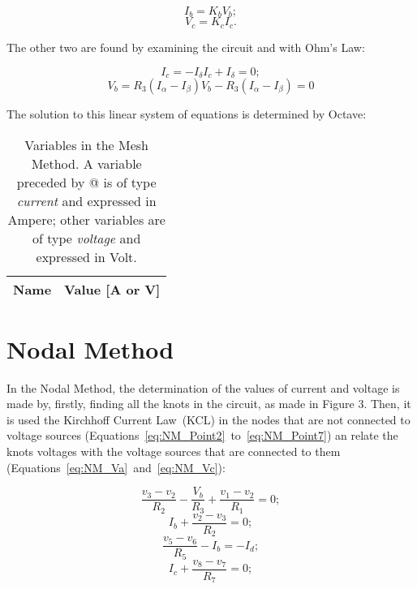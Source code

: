 \begin{equation}
  I_b = K_bV_b;
  \label{eq:Vb_Ib}
\end{equation}
\begin{equation}
  V_c = K_cI_c.
  \label{eq:Vc_Ic}
\end{equation}

The other two are found by examining the circuit and with Ohm's Law:

\begin{equation}
  I_c = -I_{\delta}
  I_c + I_{\delta} = 0;
  \label{eq:NM_Ic}
\end{equation}
\begin{equation}
  V_b = R_3(I_{\alpha}-I_{\beta})
  V_b - R_3(I_{\alpha}-I_{\beta}) = 0
  \label{eq:NM_Vb}
\end{equation}

The solution to this linear system of equations is determined by Octave:

\begin{table}[h]
  \centering
  \begin{tabular}{|l|r|}
    \hline    
    {\bf Name} & {\bf Value [A or V]} \\ \hline
    
  \end{tabular}
  \caption{Variables in the Mesh Method. A variable preceded by @ is of type {\em current} and expressed in Ampere; other variables are of type {\em voltage} and expressed in Volt.}
  \label{tab:malhas}
\end{table}

\section{Nodal Method}

In the Nodal Method, the determination of the values of current and voltage is made by, firstly, finding all the knots in the circuit, as made in Figure 3.
Then, it is used the Kirchhoff Current Law~(KCL) in the nodes that are not connected to voltage sources (Equations~\ref{eq:NM_Point2}~to~\ref{eq:NM_Point7}) an relate the knots voltages with the voltage sources that are connected to them (Equations~\ref{eq:NM_Va}~and~\ref{eq:NM_Vc}):

\begin{equation}
  \frac{v_3-v_2}{R_2} - \frac{V_b}{R_3} + \frac{v_1-v_2}{R_1} = 0;
  \label{eq:NM_Point2}
\end{equation}
\begin{equation}
  I_b + \frac{v_2-v_3}{R_2} = 0;	
  \label{eq:NM_Point3}
\end{equation}
\begin{equation}
  \frac{v_5-v_6}{R_5} - I_b = -I_d;
  \label{eq:NM_Point6}
\end{equation}
\begin{equation}
  I_c + \frac{v_8-v_7}{R_7} = 0;
  \label{eq:NM_Point7}
\end{equation}

